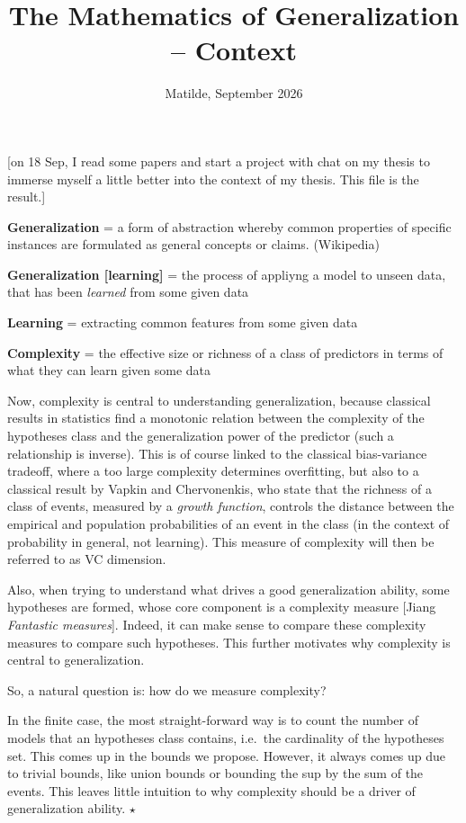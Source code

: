 \documentclass{amsart}
\title{The Mathematics of Generalization -- Context}
\author{Matilde, September 2026}
\begin{document}
\maketitle

[on 18 Sep, I read some papers and start a project with chat on my thesis to immerse myself a little better into the context of my thesis. This file is the result.]


{\bf Generalization} = a form of abstraction whereby common properties of specific instances are formulated as general concepts or claims. (Wikipedia)


{\bf Generalization [learning]} =  the process of appliyng a model to unseen data, that has been {\it learned\/} from some given data


{\bf Learning} = extracting common features from some given data


{\bf Complexity} = the effective size or richness of a class of predictors in terms of what they can learn given some data 


Now, complexity is central to understanding generalization, because classical results in statistics find a monotonic relation between the complexity of the hypotheses class and the generalization power of the predictor (such a relationship is inverse). This is of course linked to the classical bias-variance tradeoff, where a too large complexity determines overfitting, but also to a classical result by Vapkin and Chervonenkis, who state that the richness of a class of events, measured by a {\it growth function}, controls the distance between the empirical and population probabilities of an event in the class (in the context of probability in general, not learning). This measure of complexity will then be referred to as VC dimension. 


Also, when trying to understand what drives a good generalization ability, some hypotheses are formed, whose core component is a complexity measure [Jiang {\it Fantastic measures\/}]. Indeed, it can make sense to compare these complexity measures to compare such hypotheses. This further motivates why complexity is central to generalization. 


So, a natural question is: how do we measure complexity?


In the finite case, the most straight-forward way is to count the number of models that an hypotheses class contains, i.e.\ the cardinality of the hypotheses set. This comes up in the bounds we propose. However, it always comes up due to trivial bounds, like union bounds or bounding the sup by the sum of the events. This leaves little intuition to why complexity should be a driver of generalization ability. $\star$
\end{document}
